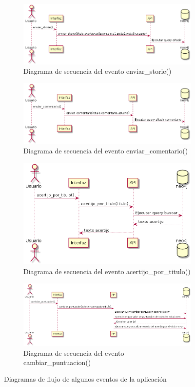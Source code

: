 \begin{figure}[hbtp] \centering
\begin{subfigure}{.6\textwidth}
     \centerline{\includegraphics[width=11cm]{figuras/enviar_storie.png}}
    \caption{Diagrama de secuencia del evento enviar_storie()} 
    \label{fig::enviarstorie}
\end{subfigure}
\begin{subfigure}{.6\textwidth}
     \centerline{\includegraphics[width=11cm]{figuras/enviar_comentario.png}}
    \caption{Diagrama de secuencia del evento enviar_comentario()} 
    \label{fig::enviarcomentario}
\end{subfigure}
\begin{subfigure}{.6\textwidth}
     \centerline{\includegraphics[width=11cm]{figuras/acertijo_por_titulo.png}}
    \caption{Diagrama de secuencia del evento acertijo_por_titulo()} 
    \label{fig::acertijoportitulo}
\end{subfigure}
\begin{subfigure}{.6\textwidth}
     \centerline{\includegraphics[width=11cm]{figuras/cambiar_puntuacion.png}}
    \caption{Diagrama de secuencia del evento cambiar_puntuacion()} 
    \label{fig::cambiarpuntuacion}
\end{subfigure}
\caption{Diagramas de flujo de algunos eventos de la aplicación }
\label{fig::secuencia}
\end{figure}